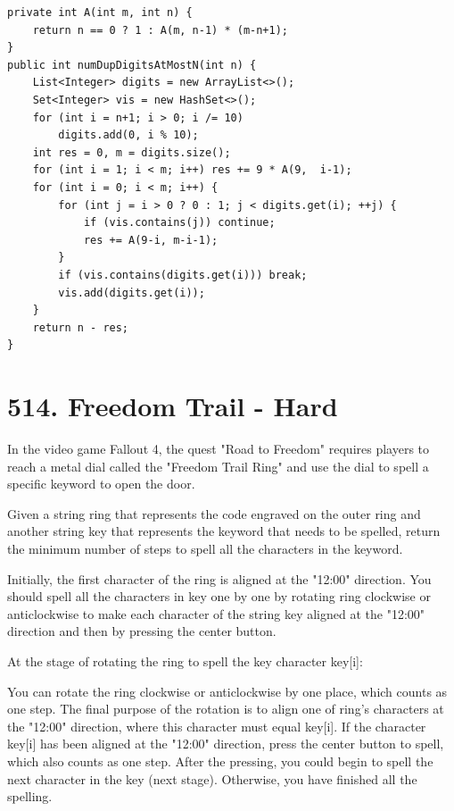 \documentclass[9pt, b5paaper]{book}
\begin{document}
\begin{verbatim}
private int A(int m, int n) {
    return n == 0 ? 1 : A(m, n-1) * (m-n+1);
}
public int numDupDigitsAtMostN(int n) {
    List<Integer> digits = new ArrayList<>();
    Set<Integer> vis = new HashSet<>();
    for (int i = n+1; i > 0; i /= 10) 
        digits.add(0, i % 10);
    int res = 0, m = digits.size();
    for (int i = 1; i < m; i++) res += 9 * A(9,  i-1);
    for (int i = 0; i < m; i++) {
        for (int j = i > 0 ? 0 : 1; j < digits.get(i); ++j) {
            if (vis.contains(j)) continue;
            res += A(9-i, m-i-1);
        }
        if (vis.contains(digits.get(i))) break;
        vis.add(digits.get(i));
    }
    return n - res;
}
\end{verbatim}

\section{514. Freedom Trail - Hard}
\label{sec-1-14}
In the video game Fallout 4, the quest "Road to Freedom" requires players to reach a metal dial called the "Freedom Trail Ring" and use the dial to spell a specific keyword to open the door.

Given a string ring that represents the code engraved on the outer ring and another string key that represents the keyword that needs to be spelled, return the minimum number of steps to spell all the characters in the keyword.

Initially, the first character of the ring is aligned at the "12:00" direction. You should spell all the characters in key one by one by rotating ring clockwise or anticlockwise to make each character of the string key aligned at the "12:00" direction and then by pressing the center button.

At the stage of rotating the ring to spell the key character key[i]:

You can rotate the ring clockwise or anticlockwise by one place, which counts as one step. The final purpose of the rotation is to align one of ring's characters at the "12:00" direction, where this character must equal key[i].
If the character key[i] has been aligned at the "12:00" direction, press the center button to spell, which also counts as one step. After the pressing, you could begin to spell the next character in the key (next stage). Otherwise, you have finished all the spelling.
\end{document}
